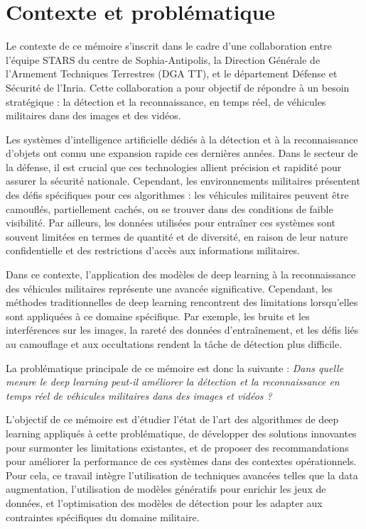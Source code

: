 \newpage
\section{Contexte et problématique}

Le contexte de ce mémoire s’inscrit dans le cadre d'une collaboration entre l'équipe STARS du centre de Sophia-Antipolis, la Direction Générale de l’Armement Techniques Terrestres (DGA TT), et le département Défense et Sécurité de l’Inria.
Cette collaboration a pour objectif de répondre à un besoin stratégique : la détection et la reconnaissance, en temps réel, de véhicules militaires dans des images et des vidéos.

Les systèmes d'intelligence artificielle dédiés à la détection et à la reconnaissance d'objets ont connu une expansion rapide ces dernières années.
Dans le secteur de la défense, il est crucial que ces technologies allient précision et rapidité pour assurer la sécurité nationale.
Cependant, les environnements militaires présentent des défis spécifiques pour ces algorithmes : les véhicules militaires peuvent être camouflés, partiellement cachés, ou se trouver dans des conditions de faible visibilité.
Par ailleurs, les données utilisées pour entraîner ces systèmes sont souvent limitées en termes de quantité et de diversité, en raison de leur nature confidentielle et des restrictions d'accès aux informations militaires.

Dans ce contexte, l'application des modèles de deep learning à la reconnaissance des véhicules militaires représente une avancée significative.
Cependant, les méthodes traditionnelles de deep learning rencontrent des limitations lorsqu'elles sont appliquées à ce domaine spécifique.
Par exemple, les bruits et les interférences sur les images, la rareté des données d'entraînement, et les défis liés au camouflage et aux occultations rendent la tâche de détection plus difficile.

La problématique principale de ce mémoire est donc la suivante :
\textit{Dans quelle mesure le deep learning peut-il améliorer la détection et la reconnaissance en temps réel de véhicules militaires dans des images et vidéos ?}

L’objectif de ce mémoire est d'étudier l'état de l'art des algorithmes de deep learning appliqués à cette problématique, de développer des solutions innovantes pour surmonter les limitations existantes, et de proposer des recommandations pour améliorer la performance de ces systèmes dans des contextes opérationnels.
Pour cela, ce travail intègre l'utilisation de techniques avancées telles que la data augmentation, l'utilisation de modèles génératifs pour enrichir les jeux de données, et l'optimisation des modèles de détection pour les adapter aux contraintes spécifiques du domaine militaire.

